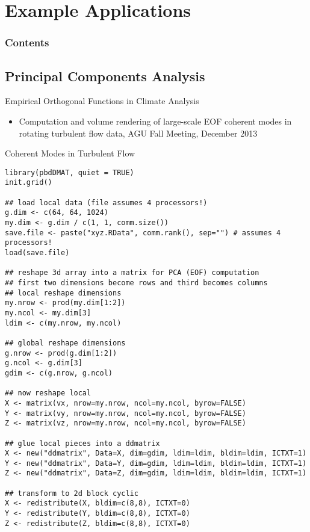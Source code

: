 \section[Applications]{Example Applications}

\hidenum
\begin{frame}[noframenumbering]
\frametitle{Contents}
 \tableofcontents[currentsection,hideothersubsections,sectionstyle=show/hide]
\end{frame}
\shownum

\subsection{Principal Components Analysis}

\begin{frame}
\begin{block}{Empirical Orthogonal Functions in Climate Analysis}
\begin{itemize}
\item Computation and volume rendering of large-scale EOF coherent
  modes in rotating turbulent flow data, AGU Fall Meeting, December 2013
\end{itemize}
\end{block}
\end{frame}

\begin{frame}
  \begin{exampleblock}{Coherent Modes in Turbulent Flow}\pause
\begin{lstlisting}[title=Get and Redistribute the Data]
library(pbdDMAT, quiet = TRUE)
init.grid()

## load local data (file assumes 4 processors!)
g.dim <- c(64, 64, 1024)
my.dim <- g.dim / c(1, 1, comm.size())
save.file <- paste("xyz.RData", comm.rank(), sep="") # assumes 4 processors!
load(save.file)

## reshape 3d array into a matrix for PCA (EOF) computation
## first two dimensions become rows and third becomes columns
## local reshape dimensions
my.nrow <- prod(my.dim[1:2])
my.ncol <- my.dim[3]
ldim <- c(my.nrow, my.ncol)

## global reshape dimensions
g.nrow <- prod(g.dim[1:2])
g.ncol <- g.dim[3]
gdim <- c(g.nrow, g.ncol)

## now reshape local
X <- matrix(vx, nrow=my.nrow, ncol=my.ncol, byrow=FALSE)
Y <- matrix(vy, nrow=my.nrow, ncol=my.ncol, byrow=FALSE)
Z <- matrix(vz, nrow=my.nrow, ncol=my.ncol, byrow=FALSE)

## glue local pieces into a ddmatrix
X <- new("ddmatrix", Data=X, dim=gdim, ldim=ldim, bldim=ldim, ICTXT=1)
Y <- new("ddmatrix", Data=Y, dim=gdim, ldim=ldim, bldim=ldim, ICTXT=1)
Z <- new("ddmatrix", Data=Z, dim=gdim, ldim=ldim, bldim=ldim, ICTXT=1)

## transform to 2d block cyclic
X <- redistribute(X, bldim=c(8,8), ICTXT=0)
Y <- redistribute(Y, bldim=c(8,8), ICTXT=0)
Z <- redistribute(Z, bldim=c(8,8), ICTXT=0)
\end{lstlisting}
  \end{exampleblock}
\end{frame}

